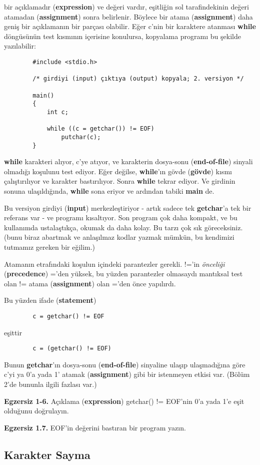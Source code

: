 \documentclass[a4paper,12pt,oneside]{book}
\begin{document}
bir açıklamadır (\textbf{expression}) ve değeri vardır, eşitliğin sol tarafindekinin değeri atamadan (\textbf{assignment}) sonra belirlenir. Böylece bir atama (\textbf{assignment}) daha geniş bir açıklamanın bir parçası olabilir. Eğer c'nin bir karaktere atanması \textbf{while} döngüsünün test kısmının içerisine konulursa, kopyalama programı bu şekilde yazılabilir:
\begin{lstlisting}
		#include <stdio.h>

		/* girdiyi (input) çıktıya (output) kopyala; 2. versiyon */

		main()
		{
			int c;

			while ((c = getchar()) != EOF)
				putchar(c);
		}
\end{lstlisting}

\textbf{while} karakteri alıyor, c'ye atıyor, ve karakterin dosya-sonu (\textbf{end-of-file}) sinyali olmadığı koşulunu test ediyor. Eğer değilse, \textbf{while}'ın gövde (\textbf{gövde}) kısmı çalıştırılıyor ve karakter bastırılıyor. Sonra \textbf{while} tekrar ediyor. Ve girdinin sonuna ulaşıldığında, \textbf{while} sona eriyor ve ardından tabiki \textbf{main} de.

\par Bu versiyon girdiyi (\textbf{input}) merkezleştiriyor - artık sadece tek \textbf{getchar}'a tek bir referans var - ve programı kısaltıyor. Son program çok daha kompakt, ve bu kullanımda ustalaştıkça, okumak da daha kolay. Bu tarzı çok sık göreceksiniz. (bunu biraz abartmak ve anlaşılmaz kodlar yazmak mümkün, bu kendimizi tutmamız gereken bir eğilim.)

\par Atamanın etrafındaki koşulun içindeki parantezler gerekli. !='in \textit{önceliği} (\textbf{precedence}) ='den yüksek, bu yüzden parantezler olmasaydı mantıksal test olan != atama (\textbf{assignment}) olan ='den önce yapılırdı. \\ \pagebreak

Bu yüzden ifade (\textbf{statement})

\begin{lstlisting}
		c = getchar() != EOF
\end{lstlisting}
eşittir
\begin{lstlisting}
		c = (getchar() != EOF)
\end{lstlisting}
Bunun \textbf{getchar}'ın dosya-sonu (\textbf{end-of-file}) sinyaline ulaşıp ulaşmadığına göre c'yi ya 0'a yada 1' atamak (\textbf{assignment}) gibi bir istenmeyen etkisi var. (Bölüm 2'de bununla ilgili fazlası var.) \newline
\par \textbf{Egzersiz 1-6.} Açıklama (\textbf{expression}) getchar() != EOF'nin 0'a yada 1'e eşit olduğunu doğrulayın.
\newline
\par \textbf{Egzersiz 1.7.} EOF'in değerini bastıran bir program yazın.

\subsection{Karakter Sayma}
\end{document}
